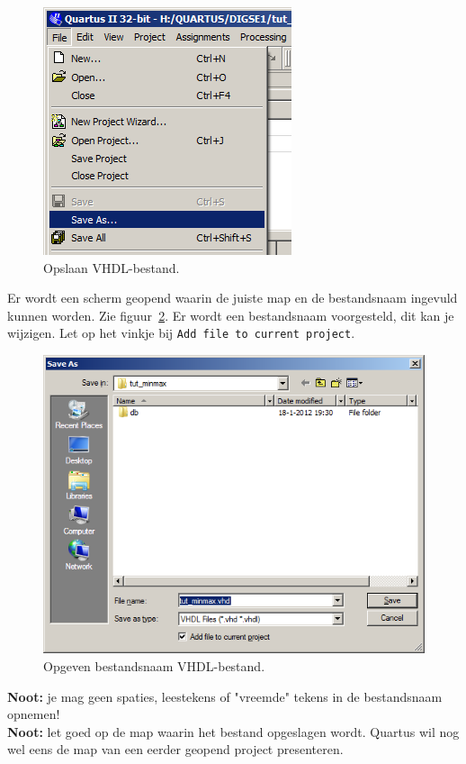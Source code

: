 \documentclass[a4paper,12pt,fleqn,twoside]{book}
\def\tutpicscale{0.455}
\newcommand{\naam}[1]{\texttt{#1}}
\begin{document}
\begin{figure}[H]
\centering
\includegraphics[scale=\tutpicscale]{045savefile.png}
\caption{Opslaan VHDL-bestand.}
\label{fig:045savefile}
\end{figure}

Er wordt een scherm geopend waarin de juiste map en de bestandsnaam ingevuld
kunnen worden. Zie figuur~\ref{fig:046savefiledialog}. Er wordt een
bestandsnaam voorgesteld, dit kan je wijzigen. Let op het vinkje bij
\naam{Add file to current project}.
 
\begin{figure}[H]
\centering
\includegraphics[scale=\tutpicscale]{046savefiledialog.png}
\caption{Opgeven bestandsnaam VHDL-bestand.}
\label{fig:046savefiledialog}
\end{figure}

\textbf{Noot:} je mag geen spaties, leestekens of "vreemde" tekens in de
bestandsnaam opnemen! \\
\textbf{Noot:} let goed op de map waarin het bestand opgeslagen wordt. Quartus
wil nog wel eens de map van een eerder geopend project presenteren.
\end{document}
